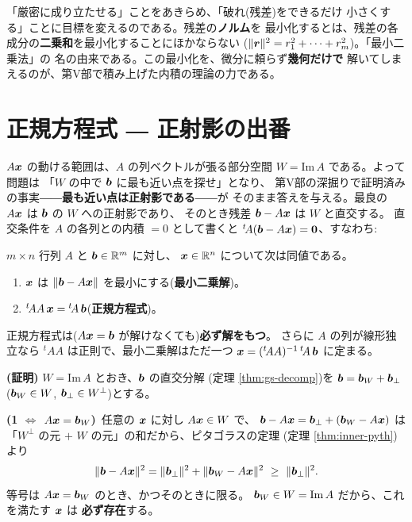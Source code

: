 「厳密に成り立たせる」ことをあきらめ、「破れ(残差)をできるだけ
小さくする」ことに目標を変えるのである。残差の\textbf{ノルム}を
最小化するとは、残差の各成分の\textbf{二乗和}を最小化することにほかならない
($\|\bm{r}\|^2 = r_1^2 + \cdots + r_m^2$)。「最小二乗法」の
名の由来である。この最小化を、微分に頼らず\textbf{幾何だけで}
解いてしまえるのが、第V部で積み上げた内積の理論の力である。

\section{正規方程式 ― 正射影の出番}

$A\bm{x}$ の動ける範囲は、$A$ の列ベクトルが張る部分空間
$W = \mathrm{Im}\,A$ である。よって問題は
「$W$ の中で $\bm{b}$ に最も近い点を探せ」となり、
第V部の深掘りで証明済みの事実――\textbf{最も近い点は正射影である}――が
そのまま答えを与える。最良の $A\bm{x}$ は $\bm{b}$ の $W$ への正射影であり、
そのとき残差 $\bm{b} - A\bm{x}$ は $W$ と直交する。
直交条件を $A$ の各列との内積 $= 0$ として書くと
${}^t\!A(\bm{b} - A\bm{x}) = \bm{0}$、すなわち:

\begin{teiri}[正規方程式]\label{thm:lsq-normal}
$m \times n$ 行列 $A$ と $\bm{b} \in \mathbb{R}^m$ に対し、
$\bm{x} \in \mathbb{R}^n$ について次は同値である。
\begin{enumerate}
\item $\bm{x}$ は $\|\bm{b} - A\bm{x}\|$ を最小にする(\textbf{最小二乗解})。
\item ${}^t\!A A\,\bm{x} = {}^t\!A\,\bm{b}$(\textbf{正規方程式})。
\end{enumerate}
正規方程式は($A\bm{x} = \bm{b}$ が解けなくても)\textbf{必ず解をもつ}。
さらに $A$ の列が線形独立なら ${}^t\!AA$ は正則で、最小二乗解はただ一つ
$\bm{x} = ({}^t\!AA)^{-1}\,{}^t\!A\,\bm{b}$ に定まる。
\end{teiri}

\noindent\textbf{(証明)}\quad
$W = \mathrm{Im}\,A$ とおき、$\bm{b}$ の直交分解
(定理 \ref{thm:gs-decomp})を $\bm{b} = \bm{b}_W + \bm{b}_{\perp}$
($\bm{b}_W \in W$, $\bm{b}_{\perp} \in W^{\perp}$)とする。

\textbf{(1 $\iff$ $A\bm{x} = \bm{b}_W$)}\
任意の $\bm{x}$ に対し $A\bm{x} \in W$ で、
$\bm{b} - A\bm{x} = \bm{b}_{\perp} + (\bm{b}_W - A\bm{x})$ は
「$W^{\perp}$ の元 $+$ $W$ の元」の和だから、ピタゴラスの定理
(定理 \ref{thm:inner-pyth})より
\[
\|\bm{b} - A\bm{x}\|^2
= \|\bm{b}_{\perp}\|^2 + \|\bm{b}_W - A\bm{x}\|^2
\ \ge\ \|\bm{b}_{\perp}\|^2.
\]
等号は $A\bm{x} = \bm{b}_W$ のとき、かつそのときに限る。
$\bm{b}_W \in W = \mathrm{Im}\,A$ だから、これを満たす $\bm{x}$ は
\textbf{必ず存在}する。

